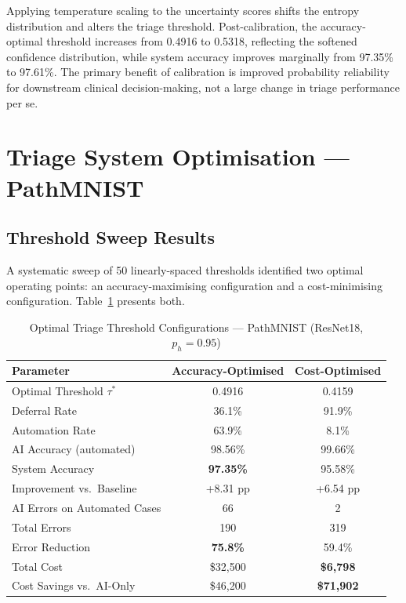 Applying temperature scaling to the uncertainty scores shifts the entropy distribution and alters the triage threshold. Post-calibration, the accuracy-optimal threshold increases from 0.4916 to 0.5318, reflecting the softened confidence distribution, while system accuracy improves marginally from 97.35\% to 97.61\%. The primary benefit of calibration is improved probability reliability for downstream clinical decision-making, not a large change in triage performance per se.

\section{Triage System Optimisation — PathMNIST}

\subsection{Threshold Sweep Results}

A systematic sweep of 50 linearly-spaced thresholds identified two optimal operating points: an accuracy-maximising configuration and a cost-minimising configuration. Table~\ref{tab:ch5_triage_thresholds} presents both.

\begin{table}[h]
\footnotesize
\centering
\caption{Optimal Triage Threshold Configurations — PathMNIST (ResNet18, $p_h = 0.95$)}
\label{tab:ch5_triage_thresholds}
\begin{tabular}{lcc}
\toprule
\textbf{Parameter} & \textbf{Accuracy-Optimised} & \textbf{Cost-Optimised} \\
\midrule
Optimal Threshold $\tau^*$   & 0.4916 & 0.4159 \\
Deferral Rate                & 36.1\% & 91.9\% \\
Automation Rate              & 63.9\% & 8.1\%  \\
AI Accuracy (automated)      & 98.56\% & 99.66\% \\
System Accuracy              & \textbf{97.35\%} & 95.58\% \\
Improvement vs.\ Baseline    & +8.31 pp & +6.54 pp \\
AI Errors on Automated Cases & 66     & 2      \\
Total Errors                 & 190    & 319    \\
Error Reduction              & \textbf{75.8\%} & 59.4\% \\
Total Cost                   & \$32,500 & \textbf{\$6,798} \\
Cost Savings vs.\ AI-Only    & \$46,200 & \textbf{\$71,902} \\
\bottomrule
\end{tabular}
\end{table}

